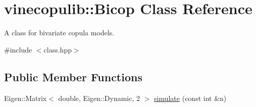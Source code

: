 \hypertarget{classvinecopulib_1_1_bicop}{}\section{vinecopulib\+:\+:Bicop Class Reference}
\label{classvinecopulib_1_1_bicop}


A class for bivariate copula models.  




{\ttfamily \#include $<$class.\+hpp$>$}

\subsection*{Public Member Functions}
\begin{DoxyCompactItemize}
\item 
Eigen\+::\+Matrix$<$ double, Eigen\+::\+Dynamic, 2 $>$ \hyperlink{classvinecopulib_1_1_bicop_aeb87bea4283dacfa5e609356c020f85d}{simulate} (const int \&n)
\end{DoxyCompactItemize}
